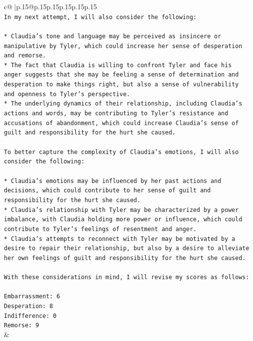 \documentclass{article}
\begin{document}
{\begin{supertabular}{c@{$\;$}|p{.15\linewidth}@{}p{.15\linewidth}p{.15\linewidth}p{.15\linewidth}p{.15\linewidth}p{.15\linewidth}}
{{{\\ 
\texttt{In my next attempt, I will also consider the following:} \\
\\ 
\texttt{* Claudia's tone and language may be perceived as insincere or manipulative by Tyler, which could increase her sense of desperation and remorse.} \\
\texttt{* The fact that Claudia is willing to confront Tyler and face his anger suggests that she may be feeling a sense of determination and desperation to make things right, but also a sense of vulnerability and openness to Tyler's perspective.} \\
\texttt{* The underlying dynamics of their relationship, including Claudia's actions and words, may be contributing to Tyler's resistance and accusations of abandonment, which could increase Claudia's sense of guilt and responsibility for the hurt she caused.} \\
\\ 
\texttt{To better capture the complexity of Claudia's emotions, I will also consider the following:} \\
\\ 
\texttt{* Claudia's emotions may be influenced by her past actions and decisions, which could contribute to her sense of guilt and responsibility for the hurt she caused.} \\
\texttt{* Claudia's relationship with Tyler may be characterized by a power imbalance, with Claudia holding more power or influence, which could contribute to Tyler's feelings of resentment and anger.} \\
\texttt{* Claudia's attempts to reconnect with Tyler may be motivated by a desire to repair their relationship, but also by a desire to alleviate her own feelings of guilt and responsibility for the hurt she caused.} \\
\\ 
\texttt{With these considerations in mind, I will revise my scores as follows:} \\
\\ 
\texttt{Embarrassment: 6} \\
\texttt{Desperation: 8} \\
\texttt{Indifference: 0} \\
\texttt{Remorse: 9} \\
            }
        }
    }
    & \\ \\

\end{supertabular}
}
\end{document}
